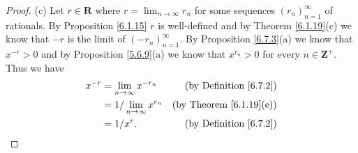 \begin{proof}{(c)}
    Let \(r \in \mathbf{R}\) where \(r = \lim_{n \to \infty} r_n\) for some sequences \((r_n)_{n = 1}^\infty\) of rationals.
    By Proposition \ref{6.1.15} \(r\) is well-defined and by Theorem \ref{6.1.19}(c) we know that \(-r\) is the limit of \((-r_n)_{n = 1}^\infty\).
    By Proposition \ref{6.7.3}(a) we know that \(x^{-r} > 0\) and by Proposition \ref{5.6.9}(a) we know that \(x^{r_n} > 0\) for every \(n \in \mathbf{Z}^+\).
    Thus we have
    \begin{align*}
        x^{-r} & = \lim_{n \to \infty} x^{-r_n}    & \text{(by Definition \ref{6.7.2})}  \\
               & = 1 / \lim_{n \to \infty} x^{r_n} & \text{(by Theorem \ref{6.1.19}(e))} \\
               & = 1 / x^r.                        & \text{(by Definition \ref{6.7.2})}
    \end{align*}
\end{proof}

